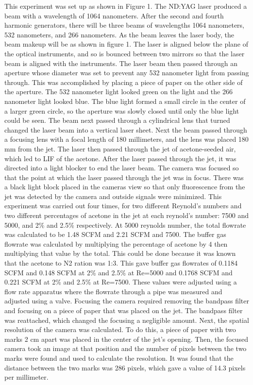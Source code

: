 \documentclass[preview,12pt]{article}
\begin{document}
This experiment was set up as shown in Figure 1.  The ND:YAG laser produced a beam with a wavelength of 1064 nanometers.  After the second and fourth harmonic generators, there will be three beams of wavelengths 1064 nanometers, 532 nanometers, and 266 nanometers.  As the beam leaves the laser body, the beam makeup will be as shown in figure 1.  The laser is aligned below the plane of the optical instruments, and so is bounced between two mirrors so that the laser beam is aligned with the instruments.    The laser beam then passed through an aperture whose diameter was set to prevent any 532 nanometer light from passing through.  This was accomplished by placing a piece of paper on the other side of the aperture.  The 532 nanometer light looked green on the light and the 266 nanometer light looked blue.  The blue light formed a small circle in the center of a larger green circle, so the aperture was slowly closed until only the blue light could be seen.  The beam next passed through a cylindrical lens that turned changed the laser beam into a vertical laser sheet.  Next the beam passed through a focusing lens with a focal length of 180 millimeters, and the lens was placed 180 mm from the jet. The laser then passed through the jet of acetone-seeded air, which led to LIF of the acetone.  After the laser passed through the jet, it was directed into a light blocker to end the laser beam.  The camera was focused so that the point at which the laser passed through the jet was in focus.  There was a black light block placed in the cameras view so that only fluorescence from the jet was detected by the camera and outside signals were minimized.  \newline
\indent This experiment was carried out four times, for two different Reynold's numbers and two different percentages of acetone in the jet at each reynold's number: 7500 and 5000, and 2\% and 2.5\% respectively.  At 5000 reynolds number, the total flowrate was calculated to be 1.48 SCFM and 2.21 SCFM and 7500.  The buffer gas flowrate was calculated by multiplying the percentage of acetone by 4 then multiplying that value by the total.  This could be done because it was known that the acetone to N2 ration was 1:3.  This gave buffer gas flowrates of 0.1184 SCFM and 0.148 SCFM at 2\% and 2.5\% at Re=5000 and 0.1768 SCFM and 0.221 SCFM at 2\% and 2.5\% at Re=7500.  These values were adjusted using a flow rate apparatus where the flowrate through a pipe was measured and adjusted using a valve. \newline
\indent Focusing the camera required removing the bandpass filter and focusing on a piece of paper that was placed on the jet.  The bandpass filter was reattached, which changed the focusing a negligible amount.  Next, the spatial resolution of the camera was calculated.  To do this, a piece of paper with two marks 2 cm apart was placed in the center of the jet's opening.  Then, the focused camera took an image at that position and the number of pixels between the two marks were found and used to calculate the resolution.  It was found that the distance between the two marks was 286 pixels, which gave a value of 14.3 pixels per millimeter. \newline
\end{document}
